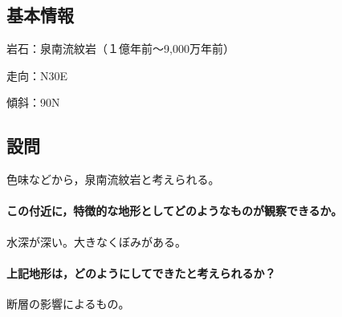 \documentclass[uplatex,b5paper]{jsreport}
\begin{document}
    \subsection{基本情報}
    岩石：泉南流紋岩（１億年前～9,000万年前）\par
    走向：N30\textdegree E\par
    傾斜：90\textdegree N\par
    \subsection{設問}
    色味などから，泉南流紋岩と考えられる。\par
      \paragraph{この付近に，特徴的な地形としてどのようなものが観察できるか。}
      水深が深い。大きなくぼみがある。
      \paragraph{上記地形は，どのようにしてできたと考えられるか？}
      断層の影響によるもの。
\end{document}
